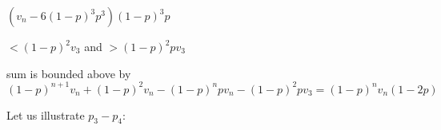 \documentclass{article}
\theoremstyle{definition}
\theoremstyle{step} \newtheorem{step}{Step}
\begin{document}

  
  
  
  

$(v_n - 6(1-p)^3p^3)(1-p)^3 p$

$< (1-p)^2 v_3$ and $>(1-p)^2pv_3$

sum is bounded above by
$$ (1-p)^{n+1}v_n + (1-p)^{2} v_n - (1-p)^n p v_n - (1-p)^{2} pv_3 = (1-p)^n
v_n(1-2p) $$

\newpage
Let us illustrate $p_3 - p_{4}$:
\end{document}
